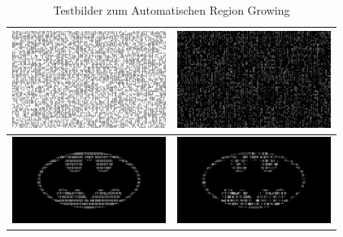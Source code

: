 \documentclass[12pt,german]{article}
\begin{document}
\begin{table}[H]
\begin{tabular}{| c | c | }
	\hline
	\includegraphics[width=5cm]{../TestData/binary.jpg}  & \includegraphics[width=5cm]{../TestData/binary_result.jpg}\\
	\hline
	\includegraphics[width=5cm]{../TestData/batman.jpg}  & \includegraphics[width=5cm]{../TestData/batman_result.jpg}\\
	\hline
     
  \end{tabular}
  \caption{Testbilder zum Automatischen Region Growing}
\end{table}

\begin{landscape}

\end{landscape}
\end{document}
